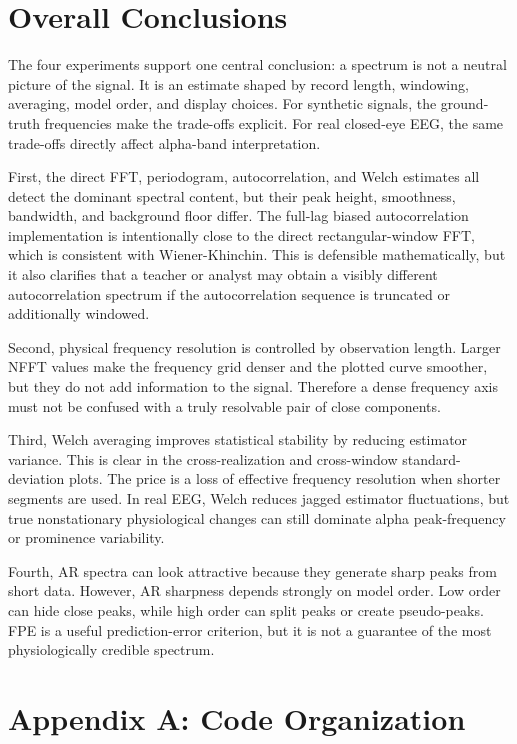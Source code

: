 \documentclass[11pt]{article}
\begin{document}
\section{Overall Conclusions}

The four experiments support one central conclusion: a spectrum is not a neutral picture of the signal. It is an estimate shaped by record length, windowing, averaging, model order, and display choices. For synthetic signals, the ground-truth frequencies make the trade-offs explicit. For real closed-eye EEG, the same trade-offs directly affect alpha-band interpretation.

First, the direct FFT, periodogram, autocorrelation, and Welch estimates all detect the dominant spectral content, but their peak height, smoothness, bandwidth, and background floor differ. The full-lag biased autocorrelation implementation is intentionally close to the direct rectangular-window FFT, which is consistent with Wiener-Khinchin. This is defensible mathematically, but it also clarifies that a teacher or analyst may obtain a visibly different autocorrelation spectrum if the autocorrelation sequence is truncated or additionally windowed.

Second, physical frequency resolution is controlled by observation length. Larger NFFT values make the frequency grid denser and the plotted curve smoother, but they do not add information to the signal. Therefore a dense frequency axis must not be confused with a truly resolvable pair of close components.

Third, Welch averaging improves statistical stability by reducing estimator variance. This is clear in the cross-realization and cross-window standard-deviation plots. The price is a loss of effective frequency resolution when shorter segments are used. In real EEG, Welch reduces jagged estimator fluctuations, but true nonstationary physiological changes can still dominate alpha peak-frequency or prominence variability.

Fourth, AR spectra can look attractive because they generate sharp peaks from short data. However, AR sharpness depends strongly on model order. Low order can hide close peaks, while high order can split peaks or create pseudo-peaks. FPE is a useful prediction-error criterion, but it is not a guarantee of the most physiologically credible spectrum.

\section{Appendix A: Code Organization}
\end{document}
